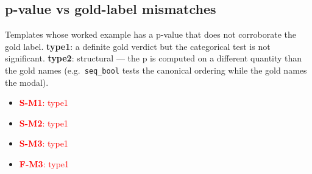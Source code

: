 \documentclass[11pt]{article}
\begin{document}
\subsection*{p-value vs gold-label mismatches}
Templates whose worked example has a p-value that does not corroborate the gold label. \textbf{type1}: a definite gold verdict but the categorical test is not significant. \textbf{type2}: structural --- the p is computed on a different quantity than the gold names (e.g.\ \texttt{seq\_bool} tests the canonical ordering while the gold names the modal).
\begin{itemize}
\item \textcolor{red}{\textbf{S-M1}: type1}
\item \textcolor{red}{\textbf{S-M2}: type1}
\item \textcolor{red}{\textbf{S-M3}: type1}
\item \textcolor{red}{\textbf{F-M3}: type1}
\end{itemize}
\end{document}
